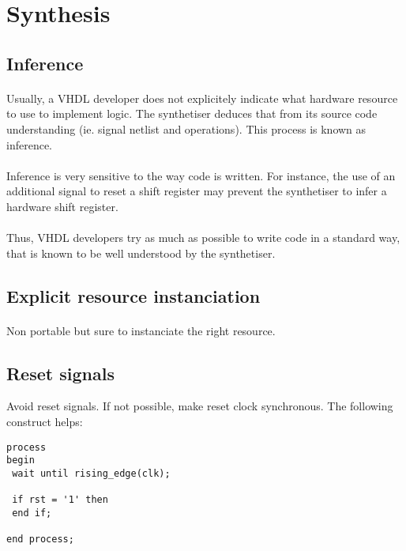 \documentclass[12pt]{article}
\begin{document}
\section{Synthesis}


\subsection{Inference}
\paragraph{}
Usually, a VHDL developer does not explicitely indicate what
hardware resource to use to implement logic. The synthetiser
deduces that from its source code understanding (ie. signal
netlist and operations). This process is known as inference.
\paragraph{}
Inference is very sensitive to the way code is written. For
instance, the use of an additional signal to reset a shift
register may prevent the synthetiser to infer a hardware
shift register.
\paragraph{}
Thus, VHDL developers try as much as possible to write code
in a standard way, that is known to be well understood by the
synthetiser.


\subsection{Explicit resource instanciation}
\paragraph{}
Non portable but sure to instanciate the right resource.


\subsection{Reset signals}
Avoid reset signals. If not possible, make reset clock synchronous.
The following construct helps:
\lstset{language=VHDL}
\begin{lstlisting}[frame=single]
process
begin
 wait until rising_edge(clk);

 if rst = '1' then
 end if;

end process;
\end{lstlisting}
\end{document}

